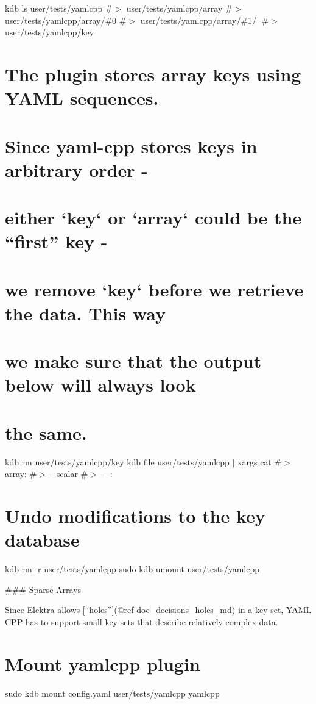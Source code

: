 kdb ls user/tests/yamlcpp \#$>$ user/tests/yamlcpp/array \#$>$ user/tests/yamlcpp/array/\#0 \#$>$ user/tests/yamlcpp/array/\#1/🔑 \#$>$ user/tests/yamlcpp/key\hypertarget{autotoc_md865_autotoc_md899}{}\section{The plugin stores array keys using Y\+A\+M\+L sequences.}\label{autotoc_md865_autotoc_md899}
\hypertarget{autotoc_md865_autotoc_md900}{}\section{Since yaml-\/cpp stores keys in arbitrary order -\/}\label{autotoc_md865_autotoc_md900}
\hypertarget{autotoc_md865_autotoc_md901}{}\section{either `key` or `array` could be the “first” key -\/}\label{autotoc_md865_autotoc_md901}
\hypertarget{autotoc_md865_autotoc_md902}{}\section{we remove `key` before we retrieve the data. This way}\label{autotoc_md865_autotoc_md902}
\hypertarget{autotoc_md865_autotoc_md903}{}\section{we make sure that the output below will always look}\label{autotoc_md865_autotoc_md903}
\hypertarget{autotoc_md865_autotoc_md904}{}\section{the same.}\label{autotoc_md865_autotoc_md904}
kdb rm user/tests/yamlcpp/key kdb file user/tests/yamlcpp $\vert$ xargs cat \#$>$ array\+: \#$>$ -\/ scalar \#$>$ -\/ 🔑\+: 🙈\hypertarget{autotoc_md865_autotoc_md905}{}\section{Undo modifications to the key database}\label{autotoc_md865_autotoc_md905}
kdb rm -\/r user/tests/yamlcpp sudo kdb umount user/tests/yamlcpp 
\begin{DoxyCode}
### Sparse Arrays

Since Elektra allows [“holes”](@ref doc\_decisions\_holes\_md) in a key set, YAML CPP has to support small key
       sets that describe relatively complex data.
\end{DoxyCode}
 \hypertarget{autotoc_md865_autotoc_md906}{}\section{Mount yamlcpp plugin}\label{autotoc_md865_autotoc_md906}
sudo kdb mount config.\+yaml user/tests/yamlcpp yamlcpp

